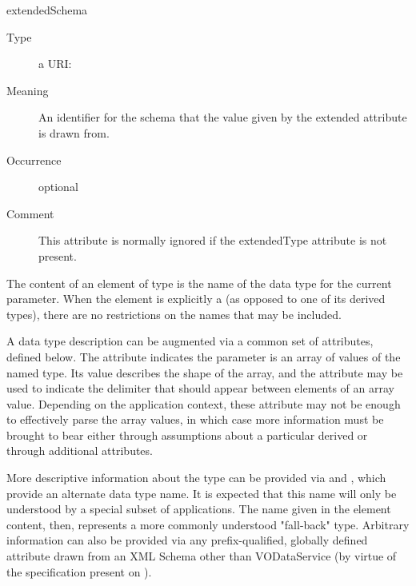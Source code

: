 \documentclass[11pt,a4paper]{ivoa}
\begin{document}
\begin{generated}
\begin{bigdescription}
\begin{description}
\end{description}
\item[extendedSchema]
\begin{description}
\item[Type] a URI: 
\item[Meaning] 
                     An identifier for the schema that the value given
                     by the extended attribute is drawn from.
                  
\item[Occurrence] optional
\item[Comment] 
                     This attribute is normally ignored if the
                     extendedType attribute is not present.
                  
\end{description}


\end{bigdescription}\endgroup

\endgroup
\end{generated}


The content of an element of type  is the name
of the data type for the current parameter.  When the element is explicitly
a  (as opposed to one of its derived types),
there are no restrictions on the names that may be included.  



A data type description can be augmented via a common set of
 attributes, defined below.  The
 attribute indicates the parameter is an array
of values of the named type.  Its value describes the shape of the
array, and the  attribute may be used to indicate
the delimiter that should appear between elements of an array value.
Depending on the application context, these attribute may not be
enough to effectively parse the array values, in which case more
information must be brought to bear either through assumptions about
a particular derived  or through additional
attributes.  



More descriptive information about the type can be provided via
 and , which
provide an alternate data type name.  It is expected that this name
will only be understood by a special subset of applications.  The name
given in the element content, then, represents a more commonly
understood "fall-back" type.   Arbitrary information can also be
provided via any prefix-qualified, globally defined attribute drawn
from an XML Schema other than VODataService (by virtue of the
 specification present
on ).
\end{document}

